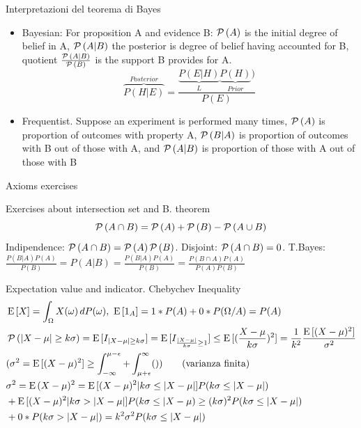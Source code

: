 \documentclass[asd-beamer.tex]{subfiles}%
\begin{document}
\begin{frame}{Interpretazioni del teorema di Bayes}
\begin{itemize}
\item Bayesian: For proposition A and evidence B: $\operatorname{\mathcal{P}}{(A)}$ is the initial degree of belief in A, $\operatorname{\mathcal{P}}{(A|B)}$ the posterior is  degree of belief having accounted for B, quotient $\frac{\operatorname{\mathcal{P}}{(A|B)}}{\operatorname{\mathcal{P}}{(B)}}$ is the support B provides for A.
\[\overbrace{P(H|E)}^{Posterior}=\frac{\underbrace{P(E|H)}_{L}\underbrace{P(H)}_{Prior})}{P(E)}\]
\item Frequentist. Suppose an experiment is performed many times, $\operatorname{\mathcal{P}}{(A)}$ is proportion of outcomes with property A, $\operatorname{\mathcal{P}}{(B|A)}$ is proportion of outcomes with B out of those with A, and $\operatorname{\mathcal{P}}{(A|B)}$ is proportion of those with A out of those with B
\end{itemize}
\end{frame}

\begin{wordonframe}{Axioms exercises}
\begin{block}{Exercises about intersection set and B. theorem}
\[\operatorname{\mathcal{P}}{(A\cap B)}=\operatorname{\mathcal{P}}{(A)}+\operatorname{\mathcal{P}}{(B)}-\operatorname{\mathcal{P}}{(A\cup B)}\]
Indipendence: $\operatorname{\mathcal{P}}{(A\cap B)}=\operatorname{\mathcal{P}}{(A)}\operatorname{\mathcal{P}}{(B)}$.
Disjoint: $\operatorname{\mathcal{P}}{(A\cap B)}=0$.
T.Bayes: $\frac{P(B|A)P(A)}{P(B)}=P(A|B)=\frac{P(B|A)P(A)}{P(B)}=\frac{P(B\cap A)P(A)}{P(A)P(B)}$
\end{block}
\begin{block}{Expectation value and indicator. Chebychev Inequality}
\begin{align*}
&\E{[X]}=\int_{\Omega}X(\omega)\,dP(\omega),\ \E{[1_A]}=1*P(A)+0*P(\Omega/A)=P(A)\\
&\prob{(|X-\mu|\geq k\sigma)}=\E{[I_{|X-\mu|\geq k\sigma}]}=\E{[I_{\frac{|X-\mu|}{k\sigma}\geq 1}]}\leq\E{[(\frac{X-\mu}{k\sigma})^2]}=\frac{1}{k^2}\frac{\E{[(X-\mu)^2]}}{\sigma^2}\\
&(\sigma^2=\E{[(X-\mu)^2]}\geq\int_{-\infty}^{\mu-\epsilon}+\int_{\mu+\epsilon}^{\infty}())\tag{varianza finita}\\
&\sigma^2=\E{(X-\mu)^2}=\E{[(X-\mu)^2|k\sigma\leq|X-\mu|]}P(k\sigma\leq|X-\mu|)\\
&+\E{[(X-\mu)^2|k\sigma>|X-\mu|]}P(k\sigma\leq|X-\mu)\geq(k\sigma)^2P(k\sigma\leq|X-\mu|)\\
&+0*P(k\sigma>|X-\mu|)=k^2\sigma^2P(k\sigma\leq|X-\mu|)
\end{align*}
\end{block}
\end{wordonframe}
\end{document}
